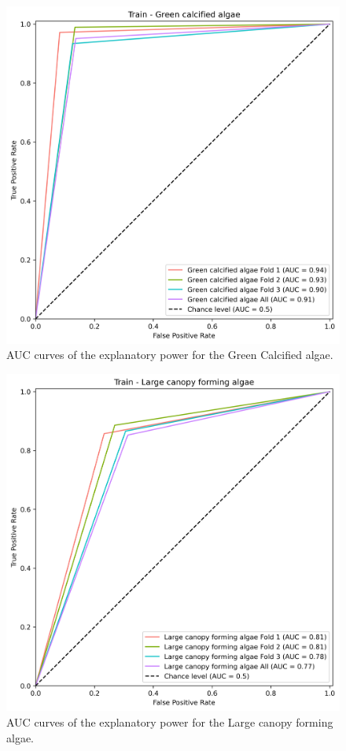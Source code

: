 \begin{figure}
\hypertarget{fig:chap3figS14}{%
\centering
\includegraphics{03-Chapitre3/figures/supplementary/03-receiver_operator_curve_train_rf_Green calcified algae.png}
\caption{AUC curves of the explanatory power for the Green Calcified
algae.}\label{fig:chap3figS14}
}
\end{figure}

\begin{figure}
\hypertarget{fig:chap3figS15}{%
\centering
\includegraphics{03-Chapitre3/figures/supplementary/03-receiver_operator_curve_train_rf_Large canopy forming algae.png}
\caption{AUC curves of the explanatory power for the Large canopy
forming algae.}\label{fig:chap3figS15}
}
\end{figure}

